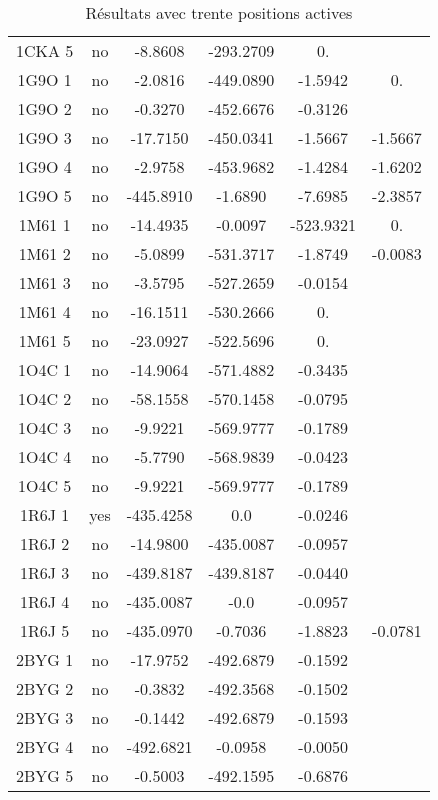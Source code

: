 \begin{table}[h]
{\begin{tabular}{cccccc}
        1CKA 5 & no & -8.8608    &    -293.2709 & 0.      & \\                    
        1G9O 1 & no & -2.0816    &    -449.0890 & -1.5942 & 0. \\               
        1G9O 2 & no & -0.3270    &    -452.6676 & -0.3126 & \\          
        1G9O 3 & no & -17.7150   &    -450.0341 & -1.5667 & -1.5667 \\         
        1G9O 4 & no & -2.9758    &    -453.9682 & -1.4284 & -1.6202 \\          
        1G9O 5 & no & -445.8910  &    -1.6890   & -7.6985   & -2.3857 \\          
        1M61 1 & no & -14.4935   &    -0.0097   & -523.9321 & 0. \\            
        1M61 2 & no & -5.0899    &    -531.3717 & -1.8749 & -0.0083 \\         
        1M61 3 & no & -3.5795    &    -527.2659 & -0.0154 & \\           
        1M61 4 & no & -16.1511   &    -530.2666 & 0. & \\              
        1M61 5 & no & -23.0927   &    -522.5696 & 0. & \\                 
        1O4C 1 & no & -14.9064   &    -571.4882 & -0.3435 & \\         
        1O4C 2 & no & -58.1558   &    -570.1458 & -0.0795 & \\         
        1O4C 3 & no & -9.9221    &    -569.9777 & -0.1789 & \\          
        1O4C 4 & no & -5.7790    &    -568.9839 & -0.0423 & \\          
        1O4C 5 & no & -9.9221    &    -569.9777 & -0.1789 & \\          
        1R6J 1 & yes& -435.4258  &     0.0      & -0.0246 & \\               
        1R6J 2 & no & -14.9800   &    -435.0087 & -0.0957 & \\         
        1R6J 3 & no & -439.8187  &    -439.8187 & -0.0440 & \\               
        1R6J 4 & no &  -435.0087  &    -0.0     & -0.0957 & \\               
        1R6J 5 & no & -435.0970  &    -0.7036   & -1.8823 & -0.0781 \\          
        2BYG 1 & no & -17.9752   &    -492.6879 & -0.1592 & \\         
        2BYG 2 & no & -0.3832    &    -492.3568 & -0.1502 & \\          
        2BYG 3 & no & -0.1442    &    -492.6879 & -0.1593 & \\          
        2BYG 4 & no & -492.6821 &    -0.0958    & -0.0050 & \\          
        2BYG 5 & no & -0.5003    &   -492.1595  & -0.6876 & \\           
       \bottomrule


 \end{tabular}  
}
 \caption{Résultats  avec trente positions actives }    
\label{tab:result_30_actives}      
\end{table}
 

